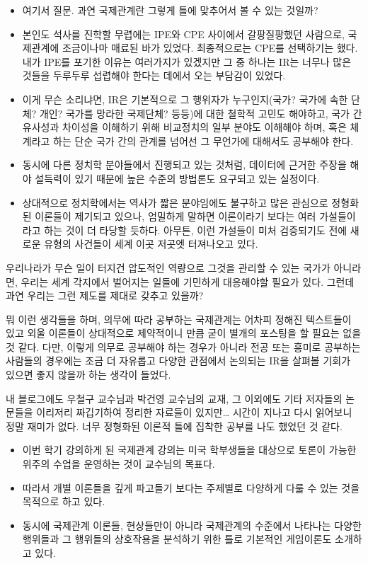 \documentclass[]{book}
\begin{document}
\begin{itemize}
\item
  여기서 질문. 과연 국제관계란 그렇게 틀에 맞추어서 볼 수 있는 것일까?
\item
  본인도 석사를 진학할 무렵에는 IPE와 CPE 사이에서 갈팡질팡했던 사람으로, 국제관계에 조금이나마 매료된 바가 있었다. 최종적으로는 CPE를 선택하기는 했다. 내가 IPE를 포기한 이유는 여러가지가 있겠지만 그 중 하나는 IR는 너무나 많은 것들을 두루두루 섭렵해야 한다는 데에서 오는 부담감이 있었다.
\item
  이게 무슨 소리냐면, IR은 기본적으로 그 행위자가 누구인지(국가? 국가에 속한 단체? 개인? 국가를 망라한 국제단체? 등등)에 대한 철학적 고민도 해야하고, 국가 간 유사성과 차이성을 이해하기 위해 비교정치의 일부 분야도 이해해야 하며, 혹은 체계라고 하는 단순 국가 간의 관계를 넘어선 그 무언가에 대해서도 공부해야 한다.
\item
  동시에 다른 정치학 분야들에서 진행되고 있는 것처럼, 데이터에 근거한 주장을 해야 설득력이 있기 때문에 높은 수준의 방법론도 요구되고 있는 실정이다.
\item
  상대적으로 정치학에서는 역사가 짧은 분야임에도 불구하고 많은 관심으로 정형화된 이론들이 제기되고 있으나, 엄밀하게 말하면 이론이라기 보다는 여러 가설들이라고 하는 것이 더 타당할 듯하다. 아무튼, 이런 가설들이 미처 검증되기도 전에 새로운 유형의 사건들이 세계 이곳 저곳엣 터져나오고 있다.
\end{itemize}

우리나라가 무슨 일이 터지건 압도적인 역량으로 그것을 관리할 수 있는 국가가 아니라면, 우리는 세계 각지에서 벌어지는 일들에 기민하게 대응해야할 필요가 있다. 그런데 과연 우리는 그런 제도를 제대로 갖추고 있을까?

뭐 이런 생각들을 하며, 의무에 따라 공부하는 국제관계는 어차피 정해진 텍스트들이 있고 외울 이론들이 상대적으로 제약적이니 만큼 굳이 별개의 포스팅을 할 필요는 없을 것 같다. 다만, 이렇게 의무로 공부해야 하는 경우가 아니라 전공 또는 흥미로 공부하는 사람들의 경우에는 조금 더 자유롭고 다양한 관점에서 논의되는 IR을 살펴볼 기회가 있으면 좋지 않을까 하는 생각이 들었다.

내 블로그에도 우철구 교수님과 박건영 교수님의 교재, 그 이외에도 기타 저자들의 논문들을 이리저리 짜깁기하여 정리한 자료들이 있지만\ldots{} 시간이 지나고 다시 읽어보니 정말 재미가 없다. 너무 정형화된 이론적 틀에 집착한 공부를 나도 했었던 것 같다.

\begin{itemize}
\item
  이번 학기 강의하게 된 국제관계 강의는 미국 학부생들을 대상으로 토론이 가능한 위주의 수업을 운영하는 것이 교수님의 목표다.
\item
  따라서 개별 이론들을 깊게 파고들기 보다는 주제별로 다양하게 다룰 수 있는 것을 목적으로 하고 있다.
\item
  동시에 국제관계 이론들, 현상들만이 아니라 국제관계의 수준에서 나타나는 다양한 행위들과 그 행위들의 상호작용을 분석하기 위한 틀로 기본적인 게임이론도 소개하고 있다.
\end{itemize}
\end{document}

